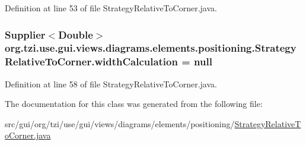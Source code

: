 Definition at line 53 of file Strategy\-Relative\-To\-Corner.\-java.

\hypertarget{classorg_1_1tzi_1_1use_1_1gui_1_1views_1_1diagrams_1_1elements_1_1positioning_1_1_strategy_relative_to_corner_a07d2f47d26dde6e0b616b8a8d99209a1}{
\subsubsection[{width\-Calculation}]{\setlength{\rightskip}{0pt plus 5cm}Supplier$<$Double$>$ org.\-tzi.\-use.\-gui.\-views.\-diagrams.\-elements.\-positioning.\-Strategy\-Relative\-To\-Corner.\-width\-Calculation = null\hspace{0.3cm}{\ttfamily [protected]}}}\label{classorg_1_1tzi_1_1use_1_1gui_1_1views_1_1diagrams_1_1elements_1_1positioning_1_1_strategy_relative_to_corner_a07d2f47d26dde6e0b616b8a8d99209a1}


Definition at line 58 of file Strategy\-Relative\-To\-Corner.\-java.



The documentation for this class was generated from the following file\-:\begin{DoxyCompactItemize}
\item 
src/gui/org/tzi/use/gui/views/diagrams/elements/positioning/\hyperlink{_strategy_relative_to_corner_8java}{Strategy\-Relative\-To\-Corner.\-java}\end{DoxyCompactItemize}
